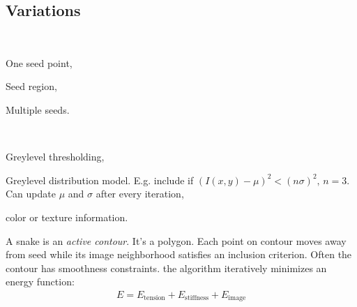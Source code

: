 \subsection{Variations}
\begin{compactdesc}
	\item[\lp{seed selection}]\hfill\\ 
		\begin{enumerate*}[label=\protect\circled{\arabic*},itemjoin=]
			\item One seed point,\\
			\item Seed region,\\
			\item Multiple seeds.\\
		\end{enumerate*}
	\item[\lp{seed selection}] \hfill\\
		\begin{enumerate*}[label=\protect\circled{\arabic*},itemjoin=]
			\item Greylevel thresholding,\\
			\item Greylevel distribution model. E.g. include if $\left( I(x,y)-\mu \right)^2<(n\sigma)^2,\, n=3$. Can update $\mu$ and $\sigma$ after every iteration,\\
			\item color or texture information.\\
		\end{enumerate*}
	\item[\lp{snakes}] A snake is an \emph{active contour}. It's a polygon. Each point on contour moves away from seed while its image neighborhood satisfies an inclusion criterion. Often the contour has smoothness constraints. the algorithm iteratively minimizes an energy function:
		\begin{gather*}
			E=E_{\text{tension}}+E_{\text{stiffness}}+E_{\text{image}}
		\end{gather*}
\end{compactdesc}

